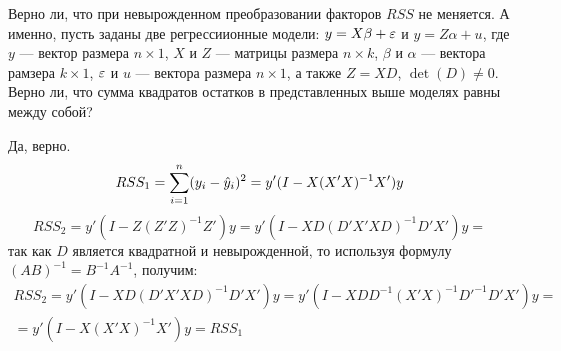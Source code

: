 \begin{problem}
Верно ли, что при невырожденном преобразовании факторов $RSS$ не меняется. А именно, пусть заданы две регрессиионные модели: $y = X\beta + \varepsilon$ и $y = Z\alpha + u$, где $y$ — вектор размера $n \times 1$, $X$ и $Z$ — матрицы размера $n \times k$, $\beta$ и $\alpha$ — вектора рамзера $k \times 1$, $\varepsilon$ и $u$ — вектора размера $n \times 1$, а также $Z=XD$, $\det(D) \not= 0.$ Верно ли, что сумма квадратов остатков в представленных выше моделях равны между собой?

\begin{sol}
Да, верно.
\[RSS_1=\sum_{i=1}^n(y_i-\hat{y}_i)^2=y'(I-X(X'X)^{-1}X')y\]
\[RSS_2=y'(I-Z(Z'Z)^{-1}Z')y=y'(I-XD(D'X'XD)^{-1}D'X')y=\]
так как $D$ является квадратной и невырожденной, то используя формулу $(AB)^{-1}=B^{-1}A^{-1}$, получим:
\begin{multline*}
RSS_2=y'(I-XD(D'X'XD)^{-1}D'X')y=y'(I-XDD^{-1}(X'X)^{-1}D'^{-1}D'X')y=\\=y'(I-X(X'X)^{-1}X')y=RSS_1
\end{multline*}
\end{sol}
\end{problem}



